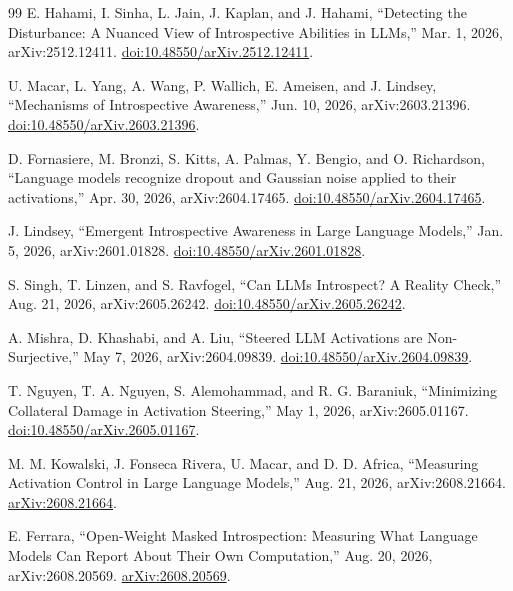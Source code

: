 \documentclass[10pt,a4paper]{article}
\begin{document}
\clearpage
\begin{thebibliography}{99}
E. Hahami, I. Sinha, L. Jain, J. Kaplan, and J. Hahami, ``Detecting the Disturbance: A Nuanced View of Introspective Abilities in LLMs,'' Mar. 1, 2026, arXiv:2512.12411. \href{https://doi.org/10.48550/arXiv.2512.12411}{doi:10.48550/arXiv.2512.12411}.

U. Macar, L. Yang, A. Wang, P. Wallich, E. Ameisen, and J. Lindsey, ``Mechanisms of Introspective Awareness,'' Jun. 10, 2026, arXiv:2603.21396. \href{https://doi.org/10.48550/arXiv.2603.21396}{doi:10.48550/arXiv.2603.21396}.

D. Fornasiere, M. Bronzi, S. Kitts, A. Palmas, Y. Bengio, and O. Richardson, ``Language models recognize dropout and Gaussian noise applied to their activations,'' Apr. 30, 2026, arXiv:2604.17465. \href{https://doi.org/10.48550/arXiv.2604.17465}{doi:10.48550/arXiv.2604.17465}.

J. Lindsey, ``Emergent Introspective Awareness in Large Language Models,'' Jan. 5, 2026, arXiv:2601.01828. \href{https://doi.org/10.48550/arXiv.2601.01828}{doi:10.48550/arXiv.2601.01828}.

S. Singh, T. Linzen, and S. Ravfogel, ``Can LLMs Introspect? A Reality Check,'' Aug. 21, 2026, arXiv:2605.26242. \href{https://doi.org/10.48550/arXiv.2605.26242}{doi:10.48550/arXiv.2605.26242}.

A. Mishra, D. Khashabi, and A. Liu, ``Steered LLM Activations are Non-Surjective,'' May 7, 2026, arXiv:2604.09839. \href{https://doi.org/10.48550/arXiv.2604.09839}{doi:10.48550/arXiv.2604.09839}.

T. Nguyen, T. A. Nguyen, S. Alemohammad, and R. G. Baraniuk, ``Minimizing Collateral Damage in Activation Steering,'' May 1, 2026, arXiv:2605.01167. \href{https://doi.org/10.48550/arXiv.2605.01167}{doi:10.48550/arXiv.2605.01167}.

M. M. Kowalski, J. Fonseca Rivera, U. Macar, and D. D. Africa, ``Measuring Activation Control in Large Language Models,'' Aug. 21, 2026, arXiv:2608.21664. \href{https://arxiv.org/abs/2608.21664}{arXiv:2608.21664}.

E. Ferrara, ``Open-Weight Masked Introspection: Measuring What Language Models Can Report About Their Own Computation,'' Aug. 20, 2026, arXiv:2608.20569. \href{https://arxiv.org/abs/2608.20569}{arXiv:2608.20569}.
\end{thebibliography}
\end{document}
